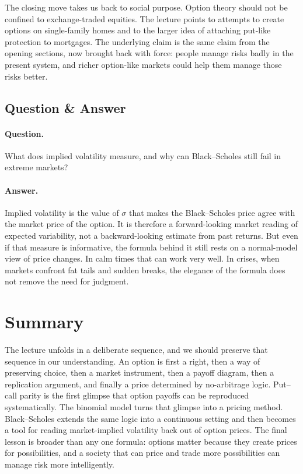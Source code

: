The closing move takes us back to social purpose. Option theory should not be confined to exchange-traded equities. The lecture points to attempts to create options on single-family homes and to the larger idea of attaching put-like protection to mortgages. The underlying claim is the same claim from the opening sections, now brought back with force: people manage risks badly in the present system, and richer option-like markets could help them manage those risks better.

\subsection{Question \& Answer}

\paragraph{Question.} What does implied volatility measure, and why can Black--Scholes still fail in extreme markets?

\paragraph{Answer.} Implied volatility is the value of $\sigma$ that makes the Black--Scholes price agree with the market price of the option. It is therefore a forward-looking market reading of expected variability, not a backward-looking estimate from past returns. But even if that measure is informative, the formula behind it still rests on a normal-model view of price changes. In calm times that can work very well. In crises, when markets confront fat tails and sudden breaks, the elegance of the formula does not remove the need for judgment.

\section{Summary}

The lecture unfolds in a deliberate sequence, and we should preserve that sequence in our understanding. An option is first a right, then a way of preserving choice, then a market instrument, then a payoff diagram, then a replication argument, and finally a price determined by no-arbitrage logic. Put--call parity is the first glimpse that option payoffs can be reproduced systematically. The binomial model turns that glimpse into a pricing method. Black--Scholes extends the same logic into a continuous setting and then becomes a tool for reading market-implied volatility back out of option prices. The final lesson is broader than any one formula: options matter because they create prices for possibilities, and a society that can price and trade more possibilities can manage risk more intelligently.
